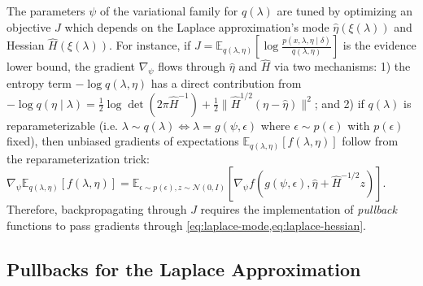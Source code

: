 \documentclass{article}
\begin{document}
The parameters $\psi$ of the variational family for $q(\lambda)$ are tuned by optimizing an objective $J$ which depends on the Laplace approximation's mode $\hat{\eta}(\xi(\lambda))$ and Hessian $\hat{H}(\xi(\lambda))$.
For instance, if $J = \mathbb{E}_{q(\lambda, \eta)} \left[\log \frac{p(x, \lambda, \eta \mid \delta)}{q(\lambda, \eta)}\right]$ is the evidence lower bound, the gradient $\nabla_\psi$ flows through $\hat{\eta}$ and $\hat{H}$ via two mechanisms:
1) the entropy term $-\log q(\lambda, \eta)$ has a direct contribution from $-\log q(\eta \mid \lambda) = \tfrac{1}{2}\log\det(2\pi\hat{H}^{-1}) + \tfrac{1}{2} \lVert \hat{H}^{1/2} (\eta - \hat{\eta}) \rVert^2$;
and 2) if $q(\lambda)$ is reparameterizable (i.e. $\lambda \sim q(\lambda) \Leftrightarrow \lambda = g(\psi, \epsilon)$ where $\epsilon \sim p(\epsilon)$ with $p(\epsilon)$ fixed), then unbiased gradients of expectations $\mathbb{E}_{q(\lambda, \eta)}[f(\lambda, \eta)]$ follow from the reparameterization trick: $\nabla_\psi \mathbb{E}_{q(\lambda, \eta)}[f(\lambda, \eta)] = \mathbb{E}_{\epsilon \sim p(\epsilon), z \sim \mathcal{N}(0, I)}[\nabla_\psi f(g(\psi, \epsilon), \hat{\eta} + \hat{H}^{-1/2} z)]$.
Therefore, backpropagating through $J$ requires the implementation of \textit{pullback} functions to pass gradients through \cref{eq:laplace-mode,eq:laplace-hessian}.

\subsection{Pullbacks for the Laplace Approximation}
\end{document}
